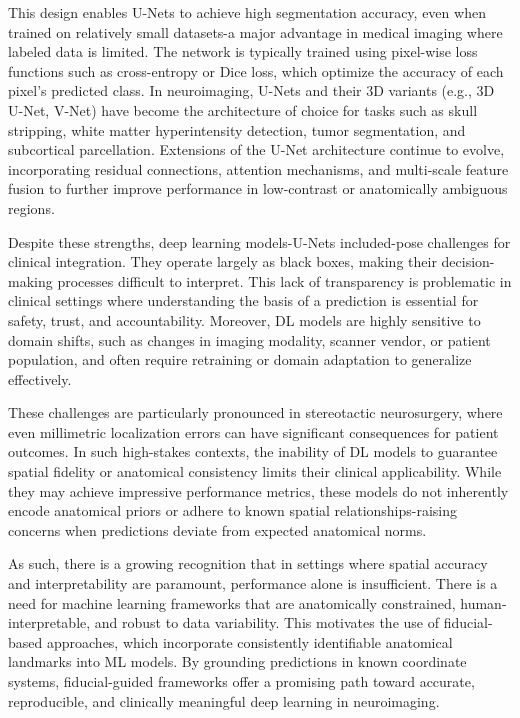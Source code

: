This design enables U-Nets to achieve high segmentation accuracy, even when trained on relatively small datasets-a major advantage in medical imaging where labeled data is limited. The network is typically trained using pixel-wise loss functions such as cross-entropy or Dice loss, which optimize the accuracy of each pixel’s predicted class. In neuroimaging, U-Nets and their 3D variants (e.g., 3D U-Net, V-Net) have become the architecture of choice for tasks such as skull stripping, white matter hyperintensity detection, tumor segmentation, and subcortical parcellation. Extensions of the U-Net architecture continue to evolve, incorporating residual connections, attention mechanisms, and multi-scale feature fusion to further improve performance in low-contrast or anatomically ambiguous regions.

Despite these strengths, deep learning models-U-Nets included-pose challenges for clinical integration. They operate largely as black boxes, making their decision-making processes difficult to interpret. This lack of transparency is problematic in clinical settings where understanding the basis of a prediction is essential for safety, trust, and accountability. Moreover, DL models are highly sensitive to domain shifts, such as changes in imaging modality, scanner vendor, or patient population, and often require retraining or domain adaptation to generalize effectively.

These challenges are particularly pronounced in stereotactic neurosurgery, where even millimetric localization errors can have significant consequences for patient outcomes. In such high-stakes contexts, the inability of DL models to guarantee spatial fidelity or anatomical consistency limits their clinical applicability. While they may achieve impressive performance metrics, these models do not inherently encode anatomical priors or adhere to known spatial relationships-raising concerns when predictions deviate from expected anatomical norms.

As such, there is a growing recognition that in settings where spatial accuracy and interpretability are paramount, performance alone is insufficient. There is a need for machine learning frameworks that are anatomically constrained, human-interpretable, and robust to data variability. This motivates the use of fiducial-based approaches, which incorporate consistently identifiable anatomical landmarks into ML models. By grounding predictions in known coordinate systems, fiducial-guided frameworks offer a promising path toward accurate, reproducible, and clinically meaningful deep learning in neuroimaging.

